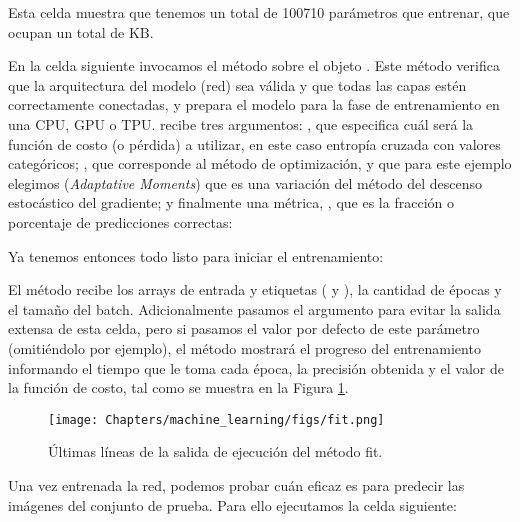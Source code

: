 
Esta celda muestra que tenemos un total de 100710 parámetros que entrenar, que ocupan un total de  KB. 

En la celda siguiente invocamos el método  sobre el objeto . Este método verifica que la arquitectura del modelo (red) sea válida y que todas las capas estén correctamente conectadas, y prepara el modelo para la fase de entrenamiento en una CPU, GPU o TPU.  recibe tres argumentos: , que especifica cuál será la función de costo (o pérdida) a utilizar, en este caso entropía cruzada con valores categóricos; , que corresponde al método de optimización, y que para este ejemplo elegimos  (\textit{Adaptative Moments}) que es una variación del método del descenso estocástico del gradiente; y finalmente una métrica, , que es la fracción o porcentaje de predicciones correctas:
 

Ya tenemos entonces todo listo para iniciar el entrenamiento:
 

El método  recibe los arrays de entrada y etiquetas ( y ), la cantidad de épocas y el tamaño del batch. Adicionalmente pasamos el argumento  para evitar la salida extensa de esta celda, pero si pasamos el valor por defecto de este parámetro (omitiéndolo por ejemplo), el método mostrará el progreso del entrenamiento informando el tiempo que le toma cada época, la precisión obtenida y el valor de la función de costo, tal como se muestra en la Figura \ref{fig:fit}.

\begin{figure}[t]
\begin{center}
    \texttt{[image: Chapters/machine\_learning/figs/fit.png]}
    \caption{Últimas líneas de la salida de ejecución del método fit.}
    \label{fig:fit}
\end{center}
\end{figure}

Una vez entrenada la red, podemos probar cuán eficaz es para predecir las imágenes del conjunto de prueba. Para ello ejecutamos la celda siguiente:
 

